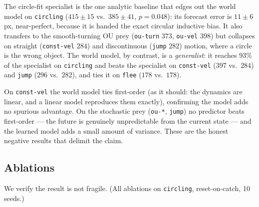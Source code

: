 \documentclass[11pt]{article}
\begin{document}
The circle-fit specialist is the one analytic baseline that edges out the world model on
\texttt{circling} ($415 \pm 15$ vs.\ $385 \pm 41$, $p = 0.048$): its forecast error is
$11 \pm 6$ px, near-perfect, because it is handed the exact circular inductive bias. It also
transfers to the smooth-turning OU prey (\texttt{ou-turn} $373$, \texttt{ou-vel} $398$) but
collapses on straight (\texttt{const-vel} $284$) and discontinuous (\texttt{jump} $282$)
motion, where a circle is the wrong object. The world model, by contrast, is a
\emph{generalist}: it reaches $93\%$ of the specialist on \texttt{circling} and beats the
specialist on \texttt{const-vel} ($397$ vs.\ $284$) and \texttt{jump} ($296$ vs.\ $282$), and
ties it on \texttt{flee} ($178$ vs.\ $178$).

On \texttt{const-vel} the world model ties first-order (as it should: the dynamics are linear,
and a linear model reproduces them exactly), confirming the model adds no spurious advantage. On
the stochastic prey (\texttt{ou-*}, \texttt{jump}) no predictor beats first-order --- the future
is genuinely unpredictable from the current state --- and the learned model adds a small amount
of variance. These are the honest negative results that delimit the claim.

\subsection{Ablations}\label{sec:ablations}

We verify the result is not fragile. (All ablations on \texttt{circling}, reset-on-catch, 10
seeds.)
\end{document}
